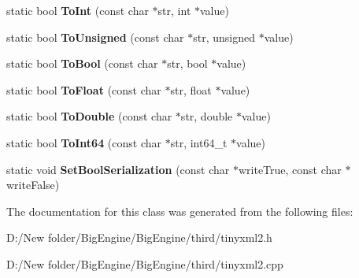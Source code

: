 \begin{DoxyCompactItemize}
\mbox{\label{classtinyxml2_1_1_x_m_l_util_ad4df4023d11ee3fca9689c49b9707323}} 
static bool {\bfseries To\+Int} (const char $\ast$str, int $\ast$value)
\item 
\mbox{\label{classtinyxml2_1_1_x_m_l_util_a210c8637d5eb4ce3d4625294af0efc2f}} 
static bool {\bfseries To\+Unsigned} (const char $\ast$str, unsigned $\ast$value)
\item 
\mbox{\label{classtinyxml2_1_1_x_m_l_util_ae5b03e0a1ca5d42052a7ac540f7aa12a}} 
static bool {\bfseries To\+Bool} (const char $\ast$str, bool $\ast$value)
\item 
\mbox{\label{classtinyxml2_1_1_x_m_l_util_a399e71edb5f29d61ea81d91ee0332bb9}} 
static bool {\bfseries To\+Float} (const char $\ast$str, float $\ast$value)
\item 
\mbox{\label{classtinyxml2_1_1_x_m_l_util_ad8f75ac140fb19c1c6e164a957c4cd53}} 
static bool {\bfseries To\+Double} (const char $\ast$str, double $\ast$value)
\item 
\mbox{\label{classtinyxml2_1_1_x_m_l_util_afe2ea09257431cd2b4b6d440552e4195}} 
static bool {\bfseries To\+Int64} (const char $\ast$str, int64\+\_\+t $\ast$value)
\item 
\mbox{\label{classtinyxml2_1_1_x_m_l_util_af98a6a80dbeec4679366c1aba4c5b747}} 
static void {\bfseries Set\+Bool\+Serialization} (const char $\ast$write\+True, const char $\ast$write\+False)
\end{DoxyCompactItemize}


The documentation for this class was generated from the following files\+:\begin{DoxyCompactItemize}
\item 
D\+:/\+New folder/\+Big\+Engine/\+Big\+Engine/third/tinyxml2.\+h\item 
D\+:/\+New folder/\+Big\+Engine/\+Big\+Engine/third/tinyxml2.\+cpp\end{DoxyCompactItemize}
